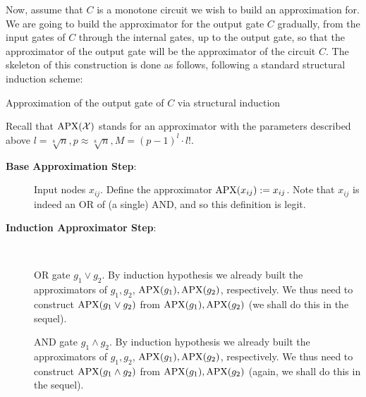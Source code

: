  

Now, assume that $C$ is a monotone circuit we wish to build an approximation for. We are going to build the approximator for the output gate $C$ gradually, from the input gates of $C$  through the internal gates, up to the output gate, so that the approximator of the output gate will be the approximator of the circuit $C$. The skeleton of this construction is done as follows, following a standard structural induction scheme:

\begin{trailer}
{Approximation of the output gate of $C$ via structural induction}

Recall that $\mathrm{APX}({\mathcal X})$ stands for an approximator with the parameters described above $ l=\sqrt[8]{n} , p \approx \sqrt[8]{n} , M=(p-1)^l \cdot l!$.

\begin{description}
\item[\textbf{Base Approximation Step}:] 
Input nodes $x_{ij}$. Define the approximator $\mathrm{APX}(x_{ij}):=x_{ij}$. Note that $x_{ij}$ is indeed an OR of (a single) AND, and so this definition is legit.

\item[\textbf{Induction  Approximator Step}:]\

 OR gate $g_1\lor g_2$. By induction hypothesis we already built the approximators of $g_1,g_2$, $\mathrm{APX}(g_1),\mathrm{APX}(g_2)$, respectively. We thus need to construct $\mathrm{APX}(g_1\lor g_2)$ from $\mathrm{APX}(g_1),\mathrm{APX}(g_2)$ (we shall do this in the sequel).

 AND gate $g_1\land g_2$. 
By induction hypothesis we already built the approximators 
of $g_1,g_2$, $\mathrm{APX}(g_1),\mathrm{APX}(g_2)$, respectively. 
We thus need to construct $\mathrm{APX}(g_1\land g_2)$ from 
$\mathrm{APX}(g_1),\mathrm{APX}(g_2)$ (again, we shall do this in the sequel).
\end{description} 
\end{trailer}




